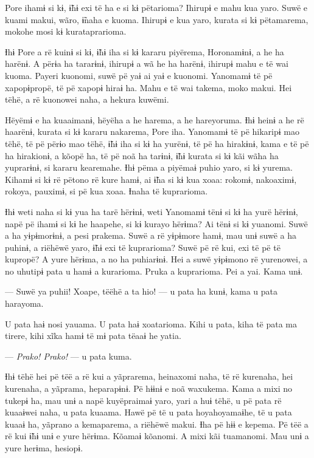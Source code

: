 Pore ihamɨ si kɨ, ɨ̃hɨ exi të ha e si kɨ pëtarioma? Ihirupɨ e mahu kua
 yaro. Suwë e kuami makui, wãro, ɨ̃naha e kuoma. Ihirupɨ e kua yaro,
 kurata si kɨ pëtamarema, mokohe mosi kɨ kurataprarioma.

Ɨhɨ Pore a rë kuinɨ si kɨ, ɨ̃hɨ iha si kɨ kararu piyërema, Horonamɨnɨ, a
he ha harënɨ. A përɨa ha tararɨnɨ, ihirupɨ a wã he ha harënɨ, ihirupɨ
mahu e të wai kuoma. Payeri kuonomi, suwë pë yaɨ ai yaɨ e kuonomi.
Yanomamɨ të pë xapopɨpropë, të pë xapopɨ hiraɨ ha. Mahu e të wai takema,
moko makui. Hei tëhë, a rë kuonowei naha, a hekura kuwëmi. 

Hëyëmɨ e ha kuaaimanɨ, hëyëha a he harema, a he hareyoruma. Ɨhɨ heinɨ a
he rë haarënɨ, kurata si kɨ kararu nakarema, Pore iha. Yanomamɨ të pë
hikaripɨ mao tëhë, të pë përɨo mao tëhë, ɨ̃hɨ iha si kɨ ha yurënɨ, të pë
ha hirakɨnɨ, kama e të pë ha hirakionɨ, a kõopë ha, të pë noã ha tarɨnɨ,
ɨ̃hɨ kurata si kɨ kãi wãha ha yuprarɨnɨ, si kararu kearemahe. Ɨhɨ pëma a
piyëmaɨ puhio yaro, si kɨ yurema. Kihamɨ si kɨ rë pëtono rë kure hamɨ,
ai ɨ̃ha si kɨ kua xoaa: rokomɨ, nakoaximɨ, rokoya, pauximɨ, si pë kua
xoaa. Ɨnaha të kuprarioma. 


Ɨhɨ weti naha si kɨ yua ha tarë hërɨnɨ, weti Yanomamɨ tënɨ si kɨ ha yurë
hërɨnɨ, napë pë ihamɨ si kɨ he haapehe, si kɨ kurayo hërɨma? Ai tënɨ si
kɨ yuanomi. Suwë a ha yɨpɨmorɨnɨ, a pesi prakema. Suwë a rë yɨpɨmore
hamɨ, mau unɨ suwë a ha puhinɨ, a riëhëwë yaro, ɨ̃hɨ exi të kuprarioma?
Suwë pë rë kui, exi të pë të kupropë? A yure hërɨma, a no ha puhiarɨnɨ.
Hei a suwë yɨpɨmono rë yurenowei, a no uhutipɨ pata u hamɨ a kurarioma.
Pruka a kuprarioma. Pei a yai. Kama unɨ. 

--- Suwë ya puhii! Xoape, tëëhë a ta hio! --- u pata ha kunɨ, kama u pata
harayoma. 

U pata haɨ nosi yauama. U pata haɨ xoatarioma. Kihi u pata, kiha të pata
ma tirere, kihi xĩka hamɨ të mɨ pata tëaaɨ he yatia. 

--- \textit{Prako! Prako!} --- u pata kuma. 

Ɨhɨ tëhë hei pë tëë a rë kui a yãprarema, heinaxomi naha, të rë
kurenaha, hei kurenaha, a yãprama, heparapɨnɨ. Pë hɨɨnɨ e noã waxukema.
Kama a mixi no tukepɨ ha, mau unɨ a napë kuyëpraimaɨ yaro, yari a huɨ
tëhë, u pë pata rë kuaaɨwei naha, u pata kuaama. Hawë pë të u pata
hoyahoyamaɨhe, të u pata kuaaɨ ha, yãprano a kemaparema, a riëhëwë
makui. Ɨha pë hɨɨ e kepema. Pë tëë a rë kui ɨ̃hɨ unɨ e yure hërɨma.
Kõamaɨ kõanomi. A mixi kãi tuamanomi. Mau unɨ a yure herɨma, hesiopɨ. 

